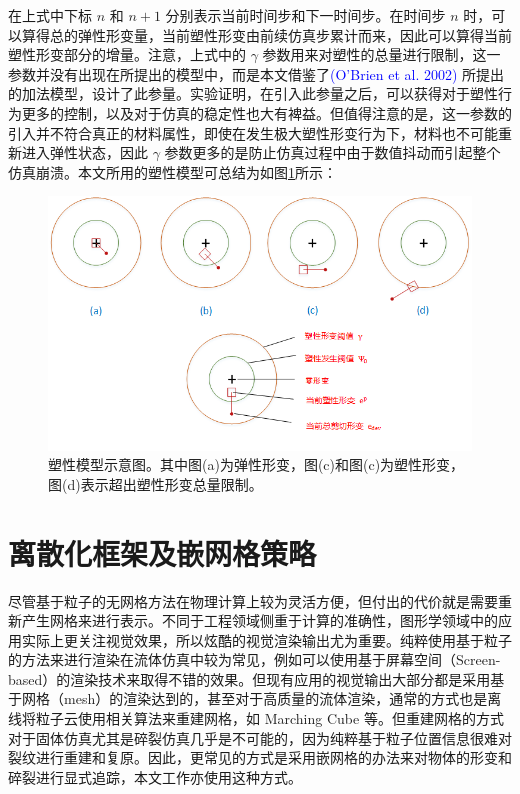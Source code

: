 在上式中下标 $n$ 和 $n + 1$ 分别表示当前时间步和下一时间步。在时间步 $n$ 时，可以算得总的弹性形变量，当前塑性形变由前续仿真步累计而来，因此可以算得当前塑性形变部分的增量。注意，上式中的 $\gamma$ 参数用来对塑性的总量进行限制，这一参数并没有出现在所提出的模型中，而是本文借鉴了\textcolor{blue}{(O'Brien et al. 2002)\parencite{OBrien2002}} 所提出的加法模型，设计了此参量。实验证明，在引入此参量之后，可以获得对于塑性行为更多的控制，以及对于仿真的稳定性也大有裨益。但值得注意的是，这一参数的引入并不符合真正的材料属性，即使在发生极大塑性形变行为下，材料也不可能重新进入弹性状态，因此 $\gamma$ 参数更多的是防止仿真过程中由于数值抖动而引起整个仿真崩溃。本文所用的塑性模型可总结为如图\ref{plasticity_model}所示：

\begin{figure}[!htb]
  \centering
  \captionsetup{justification=centering}
  \includegraphics[width=\linewidth]{chap/image/plasticity_model}

  \caption{\label{plasticity_model}
           塑性模型示意图。其中图(a)为弹性形变，图(c)和图(c)为塑性形变，图(d)表示超出塑性形变总量限制。
          }
\end{figure}


\section{离散化框架及嵌网格策略}
\label{discretization}

尽管基于粒子的无网格方法在物理计算上较为灵活方便，但付出的代价就是需要重新产生网格来进行表示。不同于工程领域侧重于计算的准确性，图形学领域中的应用实际上更关注视觉效果，所以炫酷的视觉渲染输出尤为重要。纯粹使用基于粒子的方法来进行渲染在流体仿真中较为常见，例如可以使用基于屏幕空间（Screen-based）的渲染技术来取得不错的效果。但现有应用的视觉输出大部分都是采用基于网格（mesh）的渲染达到的，甚至对于高质量的流体渲染，通常的方式也是离线将粒子云使用相关算法来重建网格，如 Marching Cube 等。但重建网格的方式对于固体仿真尤其是碎裂仿真几乎是不可能的，因为纯粹基于粒子位置信息很难对裂纹进行重建和复原。因此，更常见的方式是采用嵌网格的办法来对物体的形变和碎裂进行显式追踪，本文工作亦使用这种方式。

